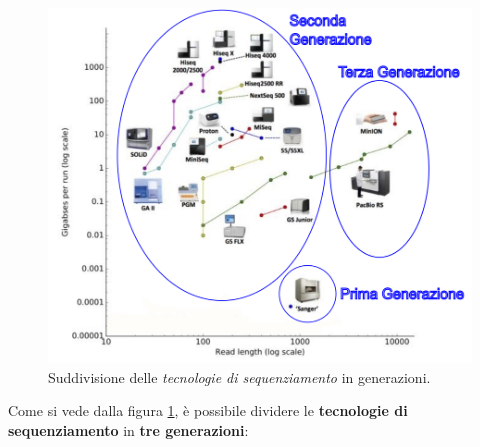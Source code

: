 \clearpage

\begin{figure}[ht]
\centering
\includegraphics[width=1\linewidth]{images/sequencing_technologies.png} 
\caption[Tecnologie di sequenziamento]{Suddivisione delle \emph{tecnologie di sequenziamento} in generazioni.}
\label{fig:tecnologie_sequenziamento}
\end{figure}
\vspace{30pt}
\noindent
Come si vede dalla figura \ref{fig:tecnologie_sequenziamento}, è possibile dividere le \textbf{tecnologie di sequenziamento} in \textbf{tre generazioni}:
